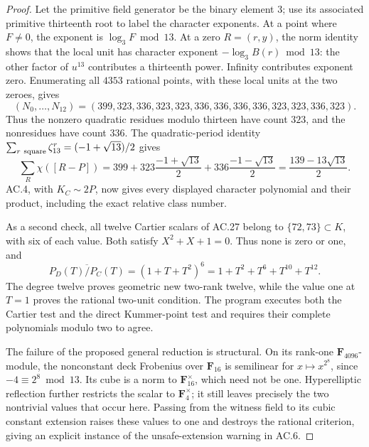 \begin{proof}
Let the primitive field generator be the binary element \(3\);
use its associated primitive thirteenth root to label the
character exponents. At a point where \(F\ne0\), the exponent is
\(\log_3F\bmod13\). At a zero \(R=(r,y)\), the norm identity
shows that the local unit has character exponent
\(-\log_3B(r)\bmod13\): the other factor of \(u^{13}\) contributes
a thirteenth power. Infinity contributes exponent zero.
Enumerating all \(4353\) rational points, with these local units
at the two zeroes, gives
\[
 (N_0,\ldots,N_{12})
  =(399,323,336,323,323,336,336,336,336,323,323,336,323).
\]
Thus the nonzero quadratic residues modulo thirteen have count
\(323\), and the nonresidues have count \(336\).
The quadratic-period identity
\(\sum_{r\ {\rm square}}\zeta_{13}^r=(-1+\sqrt{13})/2\)
gives
\[
 \sum_R\chi([R-P])
 =399+323\frac{-1+\sqrt{13}}2
       +336\frac{-1-\sqrt{13}}2
 =\frac{139-13\sqrt{13}}2.
\]
AC.4, with \(K_C\sim2P\), now gives every displayed
character polynomial and their product, including the exact
relative class number.

As a second check, all twelve Cartier scalars of AC.27 belong to
\(\{72,73\}\subset K\), with six of each value.
Both satisfy \(X^2+X+1=0\). Thus none is zero or one, and
\[
 \overline{P_D(T)/P_C(T)}
   =(1+T+T^2)^6=1+T^2+T^6+T^{10}+T^{12}.
\]
The degree twelve proves geometric new two-rank twelve, while
the value one at \(T=1\) proves the rational two-unit condition.
The program  executes
both the Cartier test and the direct Kummer-point test and
requires their complete polynomials modulo two to agree.

The failure of the proposed general reduction is structural.
On its rank-one \(\mathbf F_{4096}\)-module, the nonconstant
deck Frobenius over \(\mathbf F_{16}\) is semilinear for
\(x\mapsto x^{2^8}\), since \(-4\equiv2^8\bmod13\).
Its cube is a norm to \(\mathbf F_{16}^{\times}\), which need
not be one. Hyperelliptic reflection further restricts the scalar
to \(\mathbf F_4^\times\); it still leaves precisely the two
nontrivial values that occur here. Passing from the witness field
to its cubic constant extension raises these values to one and
destroys the rational criterion, giving an explicit instance of
the unsafe-extension warning in AC.6.
\end{proof}

